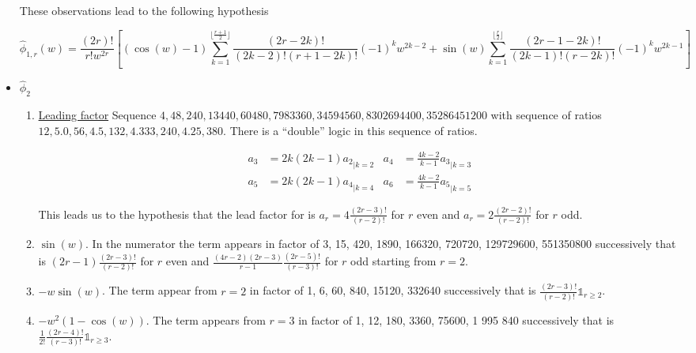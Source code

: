 \documentclass[a4paper, 11pt]{article}
\begin{document}
\begin{itemize}
\begin{enumerate}
    \end{enumerate}
    
    These observations lead to the following hypothesis
    
    \begin{small}
    \begin{equation}
      \boxed{\hat{\phi}_{1,r}(w) = \frac{(2r)!}{r!w^{2r}} \left[ (\cos(w)-1) \sum_{k=1}^{\lfloor \frac{r+1}{2} \rfloor} 
      \frac{(2r-2k)!}{(2k-2)!(r+1-2k)!} {(-1)}^k w^{2k-2} + \sin(w) \sum_{k=1}^{\lfloor \frac{r}{2} \rfloor} 
  \frac{(2r-1-2k)!}{(2k-1)!(r-2k)!} {(-1)}^k w^{2k-1} \right]}
    \end{equation}
    \end{small}
    
    \item $\hat{\phi}_2$
    
    \begin{enumerate}
      \item \underline{Leading factor}
        Sequence $4, 48, 240, 13440, 60480, 7983360, 34594560, 8302694400, 35286451200$ with sequence of ratios $12, 
        5.0, 56, 4.5, 132, 4.333, 240, 4.25, 380$. There is a “double” logic in this sequence of ratios.  
        
        \begin{align*}
          a_3 & = {2k(2k-1)a_2}_{|k=2}  & a_4 &= {\frac{4k-2}{k-1}a_3}_{|k=3} \\
          a_5 & = {2k(2k-1)a_4}_{|k=4}  & a_6 &= {\frac{4k-2}{k-1}a_5}_{|k=5}
        \end{align*}
       
        This leads us to the hypothesis that the lead factor for is $a_r = 4\frac{(2r-3)!}{(r-2)!}$ for $r$ even and 
        $a_r = 2 \frac{(2r-2)!}{(r-2)!}$ for $r$ odd. \\
    
      \item $\sin(w)$.
        In the numerator the term appears in factor of 3, 15, 420, 1890, 166320, 720720, 129729600, 551350800 
        successively that is $(2r-1)\frac{(2r-3)!}{(r-2)!}$ for $r$ even and 
        $\frac{(4r-2)(2r-3)}{r-1}\frac{(2r-5)!}{(r-3)!}$ for $r$ odd starting from $r=2$.
      \item $-w\sin(w)$.
        The term appear from $r=2$ in factor of 1, 6, 60, 840, 15120, 332640 successively that is 
        $\frac{(2r-3)!}{(r-2)!}\mathds{1}_{r\geq 2}$.  
      
      \item $-w^2(1-\cos(w))$.
        The term appears from $r=3$ in factor of 1, 12, 180, 3360, 75600, 1 995 840 successively that is 
        $\frac{1}{2!}\frac{(2r-4)!}{(r-3)!}\mathds{1}_{r\geq 3}$.  
      

\end{enumerate}
\end{itemize}
\end{document}
